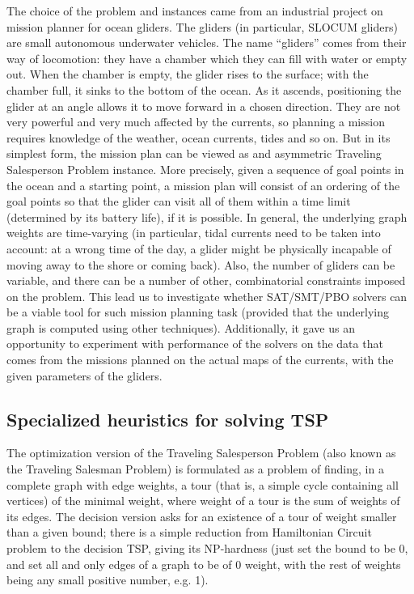 \documentclass{llncs}
\begin{document}
The choice of the problem and instances came from an industrial project on mission planner for ocean gliders. The gliders (in particular, SLOCUM gliders) are small autonomous underwater vehicles. The name ``gliders'' comes from their way of locomotion: they have a chamber which they can fill with water or empty out. When the chamber is empty, the glider rises to the surface; with the chamber full, it sinks to the bottom of the ocean. As it ascends, positioning the glider at an angle allows it to move forward in a chosen direction.   They are not very powerful and very much affected by the currents, so planning a mission requires knowledge of the weather, ocean currents, tides and so on. But in its simplest form, the mission plan can be viewed as and asymmetric Traveling Salesperson Problem instance. More precisely, given a sequence of  goal points in the ocean and a starting point, a mission plan will consist of an ordering of the goal points so that the glider can visit all of them within a time limit (determined by its battery life), if it is possible.  In general, the underlying graph weights are time-varying (in particular, tidal currents need to be taken into account: at a wrong time of the day, a glider might be physically incapable of moving away to the shore or coming back). Also,  the number of gliders can be variable, and there can be a number of other, combinatorial constraints imposed on the problem. This lead us to investigate whether SAT/SMT/PBO solvers can be a viable tool for such mission planning task (provided that the underlying graph is computed using other techniques).  Additionally, it gave us an opportunity to experiment with performance of the solvers on the data that comes from the missions planned on the actual maps of the currents, with the given parameters of the gliders. 

\subsection{Specialized heuristics for solving TSP}

The optimization version of the Traveling Salesperson Problem (also known as the Traveling Salesman Problem) is formulated as a problem of finding, in a complete graph with edge weights, a tour (that is, a simple cycle containing all vertices) of the minimal weight, where weight of a tour is the sum of weights of its edges.  The decision version asks for an existence of a tour of weight smaller than a given bound; there is a simple reduction from Hamiltonian Circuit problem to the decision TSP, giving its NP-hardness (just set the bound to be 0, and set all and only edges of a graph to be of 0 weight, with the rest of weights being any small positive number, e.g. 1).   
\end{document}
